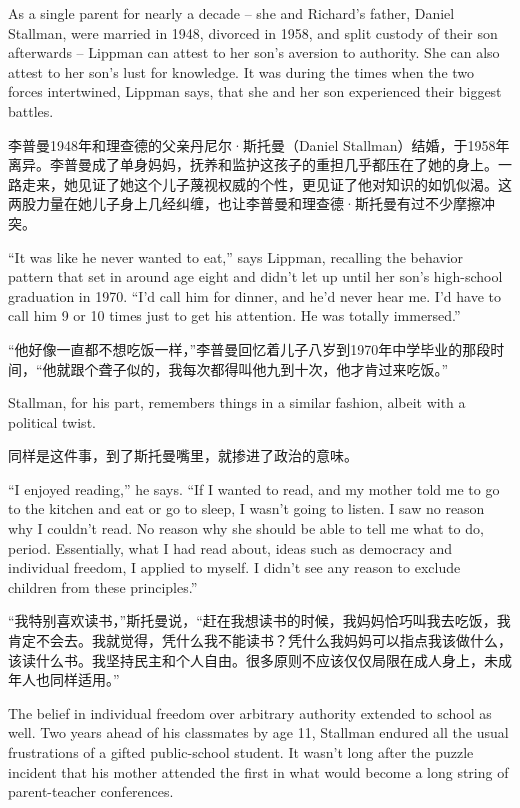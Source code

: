\ifdefined\eng
As a single parent for nearly a decade -- she and Richard's father, Daniel Stallman, were married in 1948, divorced in 1958, and split custody of their son afterwards -- Lippman can attest to her son's aversion to authority. She can also attest to her son's lust for knowledge. It was during the times when the two forces intertwined, Lippman says, that she and her son experienced their biggest battles.
\fi

\ifdefined\chs
李普曼1948年和理查德的父亲丹尼尔·斯托曼（Daniel Stallman）结婚，于1958年离异。李普曼成了单身妈妈，抚养和监护这孩子的重担几乎都压在了她的身上。一路走来，她见证了她这个儿子蔑视权威的个性，更见证了他对知识的如饥似渴。这两股力量在她儿子身上几经纠缠，也让李普曼和理查德·斯托曼有过不少摩擦冲突。
\fi

\ifdefined\eng
``It was like he never wanted to eat,'' says Lippman, recalling the behavior pattern that set in around age eight and didn't let up until her son's high-school graduation in 1970. ``I'd call him for dinner, and he'd never hear me. I'd have to call him 9 or 10 times just to get his attention. He was totally immersed.''
\fi

\ifdefined\chs
``他好像一直都不想吃饭一样，''李普曼回忆着儿子八岁到1970年中学毕业的那段时间，``他就跟个聋子似的，我每次都得叫他九到十次，他才肯过来吃饭。''
\fi

\ifdefined\eng
Stallman, for his part, remembers things in a similar fashion, albeit with a political twist.
\fi

\ifdefined\chs
同样是这件事，到了斯托曼嘴里，就掺进了政治的意味。
\fi

\ifdefined\eng
``I enjoyed reading,'' he says. ``If I wanted to read, and my mother told me to go to the kitchen and eat or go to sleep, I wasn't going to listen. I saw no reason why I couldn't read. No reason why she should be able to tell me what to do, period. Essentially, what I had read about, ideas such as democracy and individual freedom, I applied to myself. I didn't see any reason to exclude children from these principles.''
\fi

\ifdefined\chs
``我特别喜欢读书，''斯托曼说，``赶在我想读书的时候，我妈妈恰巧叫我去吃饭，我肯定不会去。我就觉得，凭什么我不能读书？凭什么我妈妈可以指点我该做什么，该读什么书。我坚持民主和个人自由。很多原则不应该仅仅局限在成人身上，未成年人也同样适用。''
\fi

\ifdefined\eng
The belief in individual freedom over arbitrary authority extended to school as well. Two years ahead of his classmates by age 11, Stallman endured all the usual frustrations of a gifted public-school student. It wasn't long after the puzzle incident that his mother attended the first in what would become a long string of parent-teacher conferences.
\fi

